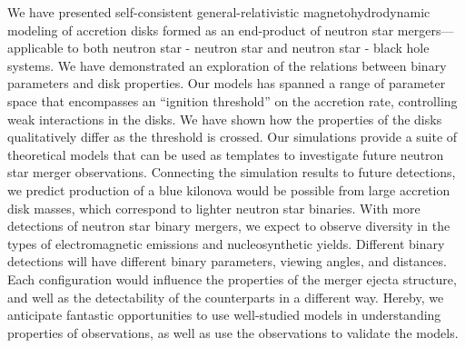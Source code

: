 We have presented self-consistent general-relativistic magnetohydrodynamic modeling of accretion disks formed as an end-product of neutron star mergers---applicable to both neutron star - neutron star and neutron star - black hole systems. We have demonstrated an exploration of the relations between binary parameters and disk properties. Our models has spanned a range of parameter space that encompasses an ``ignition threshold'' on the accretion rate, controlling weak interactions in the disks. We have shown how the properties of the disks qualitatively differ as the threshold is crossed. Our simulations provide a suite of theoretical models that can be used as templates to investigate future neutron star merger observations. Connecting the simulation results to future detections, we predict production of a blue kilonova would be possible from large accretion disk masses, which correspond to lighter neutron star binaries. With more detections of neutron star binary mergers, we expect to observe diversity in the types of electromagnetic emissions and nucleosynthetic yields. Different binary detections will have different binary parameters, viewing angles, and distances. Each configuration would influence the properties of the merger ejecta structure, and well as the detectability of the counterparts in a different way. Hereby, we anticipate fantastic opportunities to use well-studied models in understanding properties of observations, as well as use the observations to validate the models.